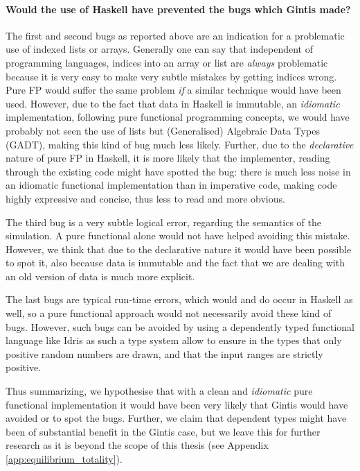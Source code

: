 \paragraph{Would the use of Haskell have prevented the bugs which Gintis made?}
The first and second bugs as reported above are an indication for a problematic use of indexed lists or arrays. Generally one can say that independent of programming languages, indices into an array or list are \textit{always} problematic because it is very easy to make very subtle mistakes by getting indices wrong. Pure FP would suffer the same problem \textit{if} a similar technique would have been used. However, due to the fact that data in Haskell is immutable, an \textit{idiomatic} implementation, following pure functional programming concepts, we would have probably not seen the use of lists but (Generalised) Algebraic Data Types (GADT), making this kind of bug much less likely. Further, due to the \textit{declarative} nature of pure FP in Haskell, it is more likely that the implementer, reading through the existing code might have spotted the bug: there is much less noise in an idiomatic functional implementation than in imperative code, making code highly expressive and concise, thus less to read and more obvious.

The third bug is a very subtle logical error, regarding the semantics of the simulation. A pure functional alone would not have helped avoiding this mistake. However, we think that due to the declarative nature it would have been possible to spot it, also because data is immutable and the fact that we are dealing with an old version of data is much more explicit. 

The last bugs are typical run-time errors, which would and do occur in Haskell as well, so a pure functional approach would not necessarily avoid these kind of bugs. However, such bugs can be avoided by using a dependently typed functional language like Idris \cite{brady_idris_2013} as such a type system allow to ensure in the types that only positive random numbers are drawn, and that the input ranges are strictly positive.

Thus summarizing, we hypothesise that with a clean and \textit{idiomatic} pure functional implementation it would have been very likely that Gintis would have avoided or to spot the bugs. Further, we claim that dependent types might have been of substantial benefit in the Gintis case, but we leave this for further research as it is beyond the scope of this thesis (see Appendix \ref{app:equilibrium_totality}).

